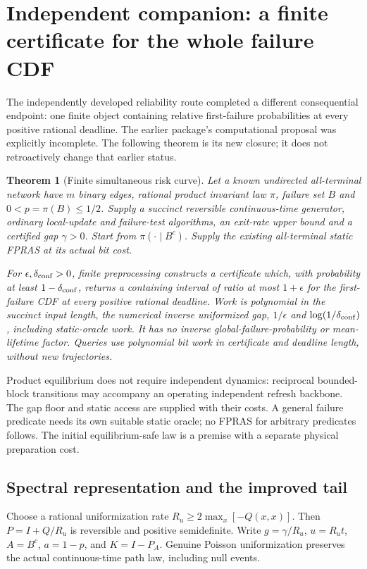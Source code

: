 \documentclass[11pt]{article}
\newtheorem{theorem}{Theorem}
\begin{document}
\section{Independent companion: a finite certificate for the whole failure CDF}
The independently developed reliability route completed a different consequential endpoint: one finite object containing relative first-failure probabilities at every positive rational deadline. The earlier package's computational proposal was explicitly incomplete. The following theorem is its new closure; it does not retroactively change that earlier status.

\begin{theorem}[Finite simultaneous risk curve]
Let a known undirected all-terminal network have \(m\) binary edges, rational product invariant law \(\pi\), failure set \(B\) and \(0<p=\pi(B)\le1/2\). Supply a succinct reversible continuous-time generator, ordinary local-update and failure-test algorithms, an exit-rate upper bound and a certified gap \(\gamma>0\). Start from \(\pi(\cdot\mid B^c)\). Supply the existing all-terminal static FPRAS at its actual bit cost.

For \(\epsilon,\delta_{\rm conf}>0\), finite preprocessing constructs a certificate which, with probability at least \(1-\delta_{\rm conf}\), returns a containing interval of ratio at most \(1+\epsilon\) for the first-failure CDF at every positive rational deadline. Work is polynomial in the succinct input length, the numerical inverse uniformized gap, \(1/\epsilon\) and \(\log(1/\delta_{\rm conf})\), including static-oracle work. It has no inverse global-failure-probability or mean-lifetime factor. Queries use polynomial bit work in certificate and deadline length, without new trajectories.
\end{theorem}

Product equilibrium does not require independent dynamics: reciprocal bounded-block transitions may accompany an operating independent refresh backbone. The gap floor and static access are supplied with their costs. A general failure predicate needs its own suitable static oracle; no FPRAS for arbitrary predicates follows. The initial equilibrium-safe law is a premise with a separate physical preparation cost.

\subsection{Spectral representation and the improved tail}
Choose a rational uniformization rate \(R_u\ge2\max_x[-Q(x,x)]\). Then \(P=I+Q/R_u\) is reversible and positive semidefinite. Write \(g=\gamma/R_u\), \(u=R_ut\), \(A=B^c\), \(a=1-p\), and \(K=I-P_A\). Genuine Poisson uniformization preserves the actual continuous-time path law, including null events.
\end{document}
